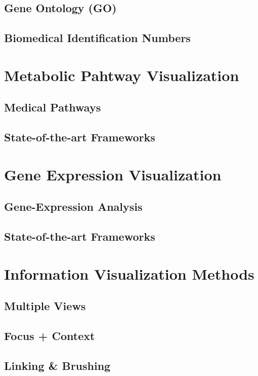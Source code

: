 \subsection{Gene Ontology (GO)}

\subsection{Biomedical Identification Numbers}

\section{Metabolic Pahtway Visualization}

\subsection{Medical Pathways}
\subsection{State-of-the-art Frameworks}

\section{Gene Expression Visualization}

\subsection{Gene-Expression Analysis}
\subsection{State-of-the-art Frameworks}

\section{Information Visualization Methods}

\subsection{Multiple Views}
\subsection{Focus + Context}
\subsection{Linking \& Brushing}
